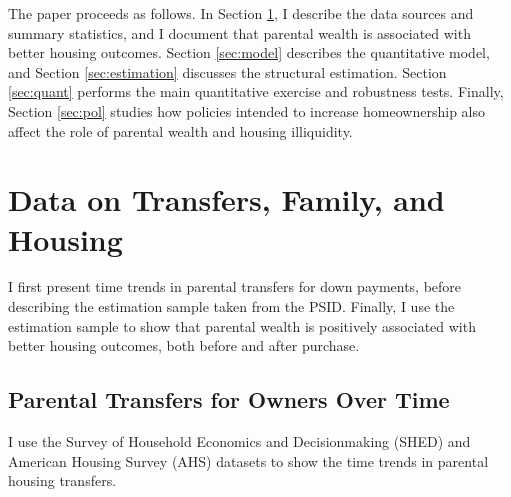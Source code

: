 \documentclass[12pt]{article}
\begin{document}
The paper proceeds as follows. In Section \ref{sec:data}, I describe the data sources and summary statistics, and I document that parental wealth is associated with better housing outcomes. Section \ref{sec:model} describes the quantitative model, and Section \ref{sec:estimation} discusses the structural estimation. Section \ref{sec:quant} performs the main quantitative exercise and robustness tests. Finally, Section \ref{sec:pol} studies how policies intended to increase homeownership also affect the role of parental wealth and housing illiquidity.

\section{Data on Transfers, Family, and Housing}\label{sec:data}
I first present time trends in parental transfers for down payments, before describing the estimation sample taken from the PSID. Finally, I use the estimation sample to show that parental wealth is positively associated with better housing outcomes, both before and after purchase.

\subsection{Parental Transfers for Owners Over Time}\label{sec:overtime}
I use the Survey of Household Economics and Decisionmaking (SHED) and American Housing Survey (AHS) datasets to show the time trends in parental housing transfers.
\end{document}
